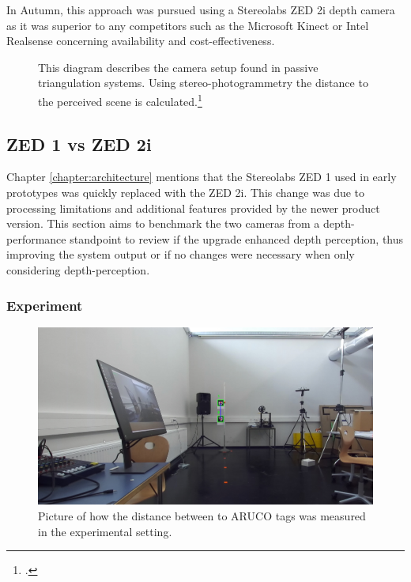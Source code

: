 In Autumn, this approach was pursued using a Stereolabs ZED 2i depth camera as it was superior to any competitors such as the Microsoft Kinect or Intel Realsense concerning availability and cost-effectiveness. 

\begin{figure}
	\centering
	
	\caption{
		This diagram describes the camera setup found in passive triangulation systems. Using stereo-photogrammetry the distance to the perceived scene is calculated.\footcite{altuntas2021triangulation}
	}
	\label{fig:passiveTriangulation}
\end{figure}

\subsection{ZED 1 vs ZED 2i}
Chapter \ref{chapter:architecture} mentions that the Stereolabs ZED 1 used in early prototypes was quickly replaced with the ZED 2i. This change was due to processing limitations and additional features provided by the newer product version.
This section aims to benchmark the two cameras from a depth-performance standpoint to review if the upgrade enhanced depth perception, thus improving the system output or if no changes were necessary when only considering depth-perception.

\subsubsection{Experiment}

\begin{figure}
	\centering
	\includegraphics[width=0.8\linewidth]{img/AutumnZEDBenchmark}
	\caption{
		Picture of how the distance between to ARUCO tags was measured in the experimental setting.
	}
	\label{fig:zedExperiment}
\end{figure}

